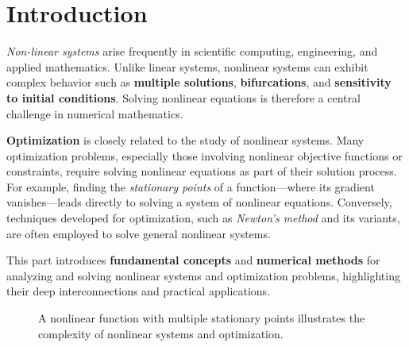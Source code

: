 \section*{Introduction}

\emph{Non-linear systems} arise frequently in scientific computing, engineering, and applied mathematics.
Unlike linear systems, nonlinear systems can exhibit complex behavior such as \textbf{multiple solutions}, \textbf{bifurcations}, and \textbf{sensitivity to initial conditions}.
Solving nonlinear equations is therefore a central challenge in numerical mathematics.

\textbf{Optimization} is closely related to the study of nonlinear systems. Many optimization problems, especially those involving nonlinear objective functions or constraints, require solving nonlinear equations as part of their solution process. For example, finding the \emph{stationary points} of a function---where its gradient vanishes---leads directly to solving a system of nonlinear equations. Conversely, techniques developed for optimization, such as \emph{Newton's method} and its variants, are often employed to solve general nonlinear systems.

This part introduces \textbf{fundamental concepts} and \textbf{numerical methods} for analyzing and solving nonlinear systems and optimization problems, highlighting their deep interconnections and practical applications.

\begin{figure}[htbp]
  \centering
  
  \caption{A nonlinear function with multiple stationary points illustrates the complexity of nonlinear systems and optimization.}
  \label{fig:nonlinear-example}
\end{figure}
